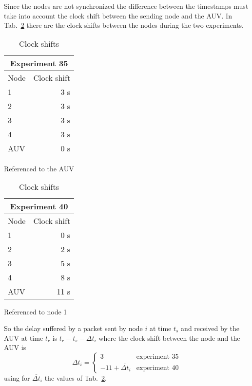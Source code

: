 \documentclass[a4paper,oneside]{article}
\begin{document}
Since the nodes are not synchronized the difference between the
timestamps must take into account the clock shift between the sending
node and the AUV. In Tab.~\ref{tab:clockshifts} there are the clock
shifts between the nodes during the two experiments.
\begin{table}[h]
  \centering
  \begin{subtable}{0.5\textwidth}
    \centering
    \begin{tabular}{lr}
      \multicolumn{2}{c}{Experiment 35} \\
      \hline
      \multicolumn{1}{c}{Node} & \multicolumn{1}{c}{Clock shift} \\
      1 & 3 s \\
      2 & 3 s \\
      3 & 3 s \\
      4 & 3 s \\
      AUV & 0 s
    \end{tabular}
    \caption{Referenced to the AUV}
  \end{subtable}%
  \begin{subtable}{0.5\textwidth}
    \centering
    \begin{tabular}{lr}
      \multicolumn{2}{c}{Experiment 40} \\
      \hline
      \multicolumn{1}{c}{Node} & \multicolumn{1}{c}{Clock shift} \\
      1 & 0 s \\
      2 & 2 s \\
      3 & 5 s \\
      4 & 8 s \\
      AUV & 11 s
    \end{tabular}
    \caption{Referenced to node 1}
  \end{subtable}
  \caption{Clock shifts}
  \label{tab:clockshifts}
\end{table}
So the delay suffered by a packet sent by node $i$ at time $t_s$ and
received by the AUV at time $t_r$ is $ t_r - t_s - \Delta t_i $ where
the clock shift between the node and the AUV is
\begin{equation*}
  \Delta t_i = \begin{cases}
    3 & \text{experiment 35} \\
    -11 + \overline{\Delta t}_i & \text{experiment 40}
  \end{cases}
\end{equation*}
using for $\overline{\Delta t}_i$ the values of
Tab.~\ref{tab:clockshifts}.
\end{document}
